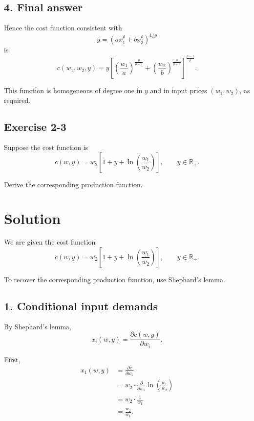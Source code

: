 \subsection*{4. Final answer}

Hence the cost function consistent with
\[
y=\left(a x_1^\rho+b x_2^\rho\right)^{1/\rho}
\]
is
\[
\boxed{
c(w_1,w_2,y)
=
y
\left[
\left(\frac{w_1}{a}\right)^{\frac{\rho}{\rho-1}}
+
\left(\frac{w_2}{b}\right)^{\frac{\rho}{\rho-1}}
\right]^{\frac{\rho-1}{\rho}}.
}
\]

This function is homogeneous of degree one in \(y\) and in input prices \((w_1,w_2)\), as required.




\vspace{30pt}
\begin{tcolorbox}[breakable]

\subsection*{Exercise 2-3}

Suppose the cost function is
\[
c(w,y)=w_2\left[1+y+\ln\left(\frac{w_1}{w_2}\right)\right],
\qquad y \in \mathbb{R}_+.
\]

Derive the corresponding production function.

\end{tcolorbox}

\section*{Solution}

We are given the cost function
\[
c(w,y)=w_2\left[1+y+\ln\left(\frac{w_1}{w_2}\right)\right],
\qquad y\in \mathbb{R}_+.
\]

To recover the corresponding production function, use Shephard's lemma.

\subsection*{1. Conditional input demands}

By Shephard's lemma,
\[
x_i(w,y)=\frac{\partial c(w,y)}{\partial w_i}.
\]

First,
\[
\begin{aligned}
x_1(w,y)
&=\frac{\partial c}{\partial w_1}\\
&=
w_2 \cdot \frac{\partial}{\partial w_1}\ln\left(\frac{w_1}{w_2}\right)\\
&=
w_2\cdot \frac{1}{w_1}\\
&=
\frac{w_2}{w_1}.
\end{aligned}
\]

